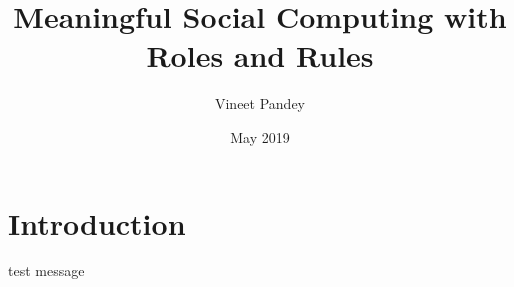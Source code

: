 \documentclass{article}
\title{Meaningful Social Computing with Roles and Rules}
\author{Vineet Pandey}
\date{May 2019}
\begin{document}
\maketitle



\section{Introduction}
test message
\end{document}

